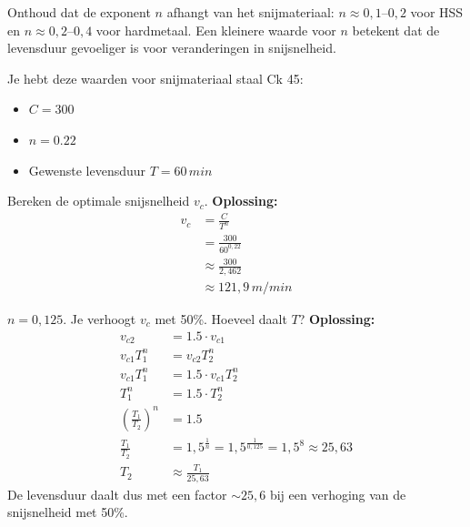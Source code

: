 \documentclass[a4paper,11pt,twoside]{report}
\begin{document}
\begin{examenbox}
    Onthoud dat de exponent $n$ afhangt van het snijmateriaal: $n \approx 0{,}1\text{--}0{,}2$ voor HSS en $n \approx 0{,}2\text{--}0{,}4$ voor hardmetaal.
    Een kleinere waarde voor $n$ betekent dat de levensduur gevoeliger is voor veranderingen in snijsnelheid.
\end{examenbox}

\begin{voorbeeld}
    Je hebt deze waarden voor snijmateriaal staal Ck 45:
    \begin{itemize}
        \item $C = 300$
        \item $n = 0.22$
        \item Gewenste levensduur $T = 60\,\si{min}$
    \end{itemize}
    Bereken de optimale snijsnelheid $v_c$.
    \textbf{Oplossing:}
    \begin{align*}
        v_c & = \frac{C}{T^n}             \\
            & = \frac{300}{60^{0{,}22}}   \\
            & \approx \frac{300}{2{,}462} \\
            & \approx 121{,}9\,\si{m/min}
    \end{align*}
\end{voorbeeld}

\begin{voorbeeld}
    $n = 0{,}125$. Je verhoogt $v_c$ met 50\%. Hoeveel daalt $T$?
    \textbf{Oplossing:}
    \begin{align*}
        v_{c2}                         & = 1.5 \cdot v_{c1}                                                          \\
        v_{c1} T_1^n                   & = v_{c2} T_2^n                                                              \\
        v_{c1} T_1^n                   & = 1.5 \cdot v_{c1} T_2^n                                                    \\
        T_1^n                          & = 1.5 \cdot T_2^n                                                           \\
        \left(\frac{T_1}{T_2}\right)^n & = 1.5                                                                       \\
        \frac{T_1}{T_2}                & = 1{,}5^{\frac{1}{n}} = 1{,}5^{\frac{1}{0{,}125}} = 1{,}5^8 \approx 25{,}63 \\
        T_2                            & \approx \frac{T_1}{25{,}63}
    \end{align*}
    De levensduur daalt dus met een factor ${\sim}25{,}6$ bij een verhoging van de snijsnelheid met 50\%.
\end{voorbeeld}
\end{document}
